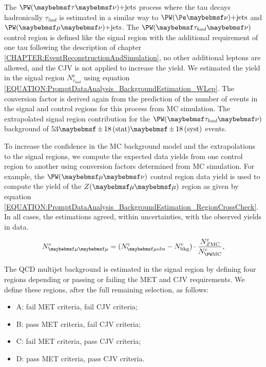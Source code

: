 The $\PW (\tau \nu)\text{+jets}$ process where the tau decays hadronically $\tau_{had}$ is estimated in a similar way to $\PW (\Pe \nu)\text{+jets}$ and $\PW (\mu \nu)\text{+jets}$. The $\PW (\tau_{had} \nu)$ control region is defined like the signal region with the additional requirement of one tau following the description of chapter \ref{CHAPTER:EventReconstructionAndSimulation}, no other additional leptons are allowed, and the \gls{CJV} is not applied to increase the yield. We estimated the yield in the signal region $N^\mathrm{s}_{\tau_{had}}$ using equation \ref{EQUATION:PromptDataAnalysis_BackgroundEstimation_WLep}. The conversion factor is derived again from the prediction of the number of events in the signal and control regions for this process from \gls{MC} simulation. The extrapolated signal region contribution for the $\PW (\tau_{had} \nu)$ background of $53 \pm 18\stat \pm 18\syst$ events.

To increase the confidence in the \gls{MC} background model and the extrapolations to the signal regions, we compute the expected data yields from one control region to another using conversion factors determined from \gls{MC} simulation. For example, the $\PW (\mu \nu)$ control region data yield is used to compute the yield of the $\Z (\mu \mu)$ region as given by equation \ref{EQUATION:PromptDataAnalysis_BackgroundEstimation_RegionCrossCheck}. In all cases, the estimations agreed, within uncertainties, with the observed yields in data. 

\begin{equation}
N^\mathrm{c}_{\mu \mu} = (N^\mathrm{c}_{\mu \text{obs}} - N^\mathrm{c}_\text{bkg}) \cdot \frac{N^\mathrm{c}_{\Z \mathrm{MC}}}{N^\mathrm{c}_{\PW \mathrm{MC}}},
\label{EQUATION:PromptDataAnalysis_BackgroundEstimation_RegionCrossCheck}
\end{equation}

The \gls{QCD} multijet background is estimated in the signal region by defining four regions depending or passing or failing the \gls{MET} and \gls{CJV} requirements. We define these regions, after the full remaining selection, as follows:

\begin{itemize}
  \item{A: fail \gls{MET} criteria, fail \gls{CJV} criteria;}
  \item{B: pass \gls{MET} criteria, fail \gls{CJV} criteria;}
  \item{C: fail \gls{MET} criteria, pass \gls{CJV} criteria;}
  \item{D: pass \gls{MET} criteria, pass \gls{CJV} criteria.}
\end{itemize}

